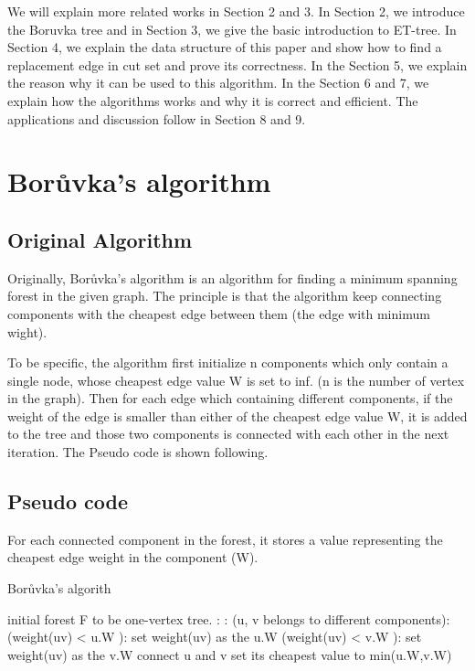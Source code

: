 \documentclass[conference,compsoc]{IEEEtran}
\begin{document}
We will explain more related works in Section 2 and 3. In Section 2, we introduce the Boruvka tree and in Section 3, we give the basic introduction to ET-tree. In Section 4, we explain the data structure of this paper and show how to find a replacement edge in cut set and prove its correctness. In the Section 5, we explain the reason why it can be used to this algorithm. In the Section 6 and 7, we explain how the algorithms works and why it is correct and efficient. The applications and discussion follow in Section 8 and 9.

\section{Borůvka's algorithm}
\subsection{Original Algorithm}
Originally, Borůvka's algorithm is an algorithm for finding a minimum spanning forest in the given graph. The principle is that the algorithm keep connecting components with the cheapest edge between them (the edge with minimum wight).
\par
To be specific, the algorithm first initialize n components which only contain a single node, whose cheapest edge value W is set to inf. (n is the number of vertex in the graph). Then for each edge which containing different components, if the weight of the edge is smaller than either of the cheapest edge value W, it is added to the tree and those two components is connected with each other in the next iteration. 
The Pseudo code is shown following.

\subsection{Pseudo code}
For each connected component in the forest, it stores a value representing the cheapest edge weight in the component (W).
\begin{algorithm}[H]
\caption{Borůvka's algorith}
\begin{algorithmic}[1]
\State initial forest F to be one-vertex tree.
:
	:
		\If (u, v belongs to different components):
			\If (weight(uv) < u.W ):
				\State set weight(uv) as the u.W
			\EndIf
			\If (weight(uv) < v.W ):
				\State set weight(uv) as the v.W
			\EndIf
		\EndIf
	\EndFor
		\State connect u and v
		\State set its cheapest value to min(u.W,v.W)
	\EndFor
\EndWhile
\end{algorithmic}
\end{algorithm}
\end{document}
